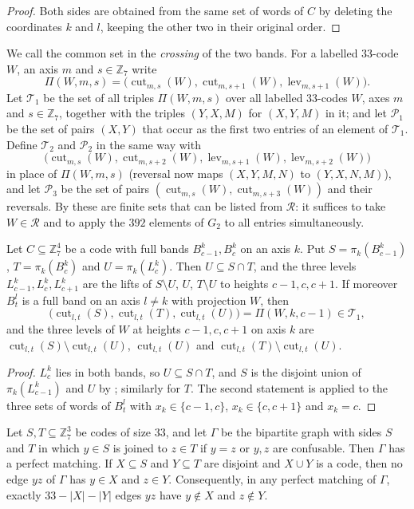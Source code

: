 \documentclass[11pt,colorlinks]{charlie}
\newcommand{\Zs}{\mathbb{Z}_7}
\newcommand{\cut}{\operatorname{cut}}
\newcommand{\lev}{\operatorname{lev}}
\newcommand{\cR}{\mathcal{R}}
\begin{document}
\begin{proof}
Both sides are obtained from the same set of words of $C$ by deleting the coordinates $k$ and $l$, keeping the other two in their original order.
\end{proof}

We call the common set in  the \emph{crossing} of the two bands. For a labelled $33$-code $W$, an axis $m$ and $s\in\Zs$ write
\[
 \Pi(W,m,s)=\big(\cut_{m,s}(W),\cut_{m,s+1}(W),\lev_{m,s+1}(W)\big).
\]
Let $\mathcal T_1$ be the set of all triples $\Pi(W,m,s)$ over all labelled $33$-codes $W$, axes $m$ and $s\in\Zs$, together with the triples $(Y,X,M)$ for $(X,Y,M)$ in it; and let $\mathcal P_1$ be the set of pairs $(X,Y)$ that occur as the first two entries of an element of $\mathcal T_1$. Define $\mathcal T_2$ and $\mathcal P_2$ in the same way with
\[
 \big(\cut_{m,s}(W),\cut_{m,s+2}(W),\lev_{m,s+1}(W),\lev_{m,s+2}(W)\big)
\]
in place of $\Pi(W,m,s)$ (reversal now maps $(X,Y,M,N)$ to $(Y,X,N,M)$), and let $\mathcal P_3$ be the set of pairs $(\cut_{m,s}(W),\cut_{m,s+3}(W))$ and their reversals. By  these are finite sets that can be listed from $\cR$: it suffices to take $W\in\cR$ and to apply the $392$ elements of $G_2$ to all entries simultaneously.

\begin{lemma}[Slabs]\label{lem:slab}
Let $C\subseteq\Zs^4$ be a code with full bands $B^k_{c-1},B^k_c$ on an axis $k$. Put $S=\pi_k(B^k_{c-1})$, $T=\pi_k(B^k_c)$ and $U=\pi_k(L^k_c)$. Then $U\subseteq S\cap T$, and the three levels $L^k_{c-1},L^k_c,L^k_{c+1}$ are the lifts of $S\setminus U$, $U$, $T\setminus U$ to heights $c-1,c,c+1$. If moreover $B^l_t$ is a full band on an axis $l\ne k$ with projection $W$, then
\[
 \big(\cut_{l,t}(S),\cut_{l,t}(T),\cut_{l,t}(U)\big)=\Pi(W,k,c-1)\in\mathcal T_1,
\]
and the three levels of $W$ at heights $c-1,c,c+1$ on axis $k$ are $\cut_{l,t}(S)\setminus\cut_{l,t}(U)$, $\cut_{l,t}(U)$ and $\cut_{l,t}(T)\setminus\cut_{l,t}(U)$.
\end{lemma}

\begin{proof}
$L^k_c$ lies in both bands, so $U\subseteq S\cap T$, and $S$ is the disjoint union of $\pi_k(L^k_{c-1})$ and $U$ by ; similarly for $T$. The second statement is  applied to the three sets of words of $B^l_t$ with $x_k\in\{c-1,c\}$, $x_k\in\{c,c+1\}$ and $x_k=c$.
\end{proof}

\begin{lemma}[Matchings]\label{lem:matching}
Let $S,T\subseteq\Zs^3$ be codes of size $33$, and let $\Gamma$ be the bipartite graph with sides $S$ and $T$ in which $y\in S$ is joined to $z\in T$ if $y=z$ or $y,z$ are confusable. Then $\Gamma$ has a perfect matching. If $X\subseteq S$ and $Y\subseteq T$ are disjoint and $X\cup Y$ is a code, then no edge $yz$ of $\Gamma$ has $y\in X$ and $z\in Y$. Consequently, in any perfect matching of $\Gamma$, exactly $33-|X|-|Y|$ edges $yz$ have $y\notin X$ and $z\notin Y$.
\end{lemma}
\end{document}
